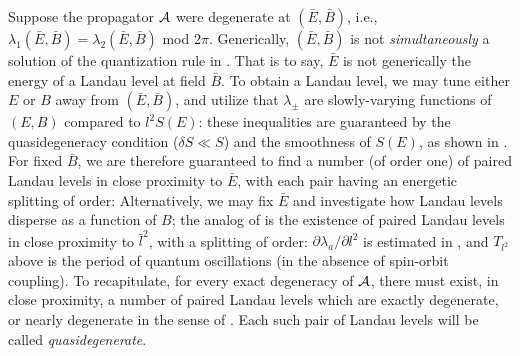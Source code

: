 \documentclass[aps, prb, showpacs, twocolumn, notitlepage, superscriptaddress]{revtex4-1}
\begin{document}
Suppose the propagator ${\cal A}$ were degenerate at $(\bar{E},\bar{B})$, i.e., $\lambda_1(\bar{E},\bar{B})=\lambda_2(\bar{E},\bar{B})$ mod $2\pi$. Generically, $(\bar{E},\bar{B})$ is not \emph{simultaneously} a solution of the quantization rule in . That is to say, $\bar{E}$ is not generically the energy of a Landau level at field $\bar{B}$. To obtain a Landau level, we may tune either $E$ or $B$   away from $(\bar{E},\bar{B})$, and  utilize that  $\lambda_{\pm}$ are slowly-varying functions of $(E,B)$ compared to $l^2S(E)$:
these inequalities are guaranteed by the quasidegeneracy condition ($\delta S{\ll}S$) and the smoothness of $S(E)$, as shown in .  For fixed $\bar{B}$, we are therefore guaranteed to find a number (of order one) of paired Landau levels  in close proximity to $\bar{E}$, with each pair having an energetic splitting of order:
Alternatively, we may fix $\bar{E}$ and investigate how Landau levels disperse as a function of $B$; the analog of   is the existence of paired Landau levels in close proximity to $\bar{l}^2$, with a splitting of order:
$\partial \lambda_a/\partial l^2$ is estimated in , and
$T_{l^2}$ above is the period of quantum oscillations (in the absence of spin-orbit coupling). To recapitulate, for every exact degeneracy of ${\cal A}$, there must exist, in close proximity, a number of paired Landau levels which are exactly degenerate, or nearly degenerate in the sense of . Each such pair of Landau levels will be called \textit{quasidegenerate}.  




\end{document}
